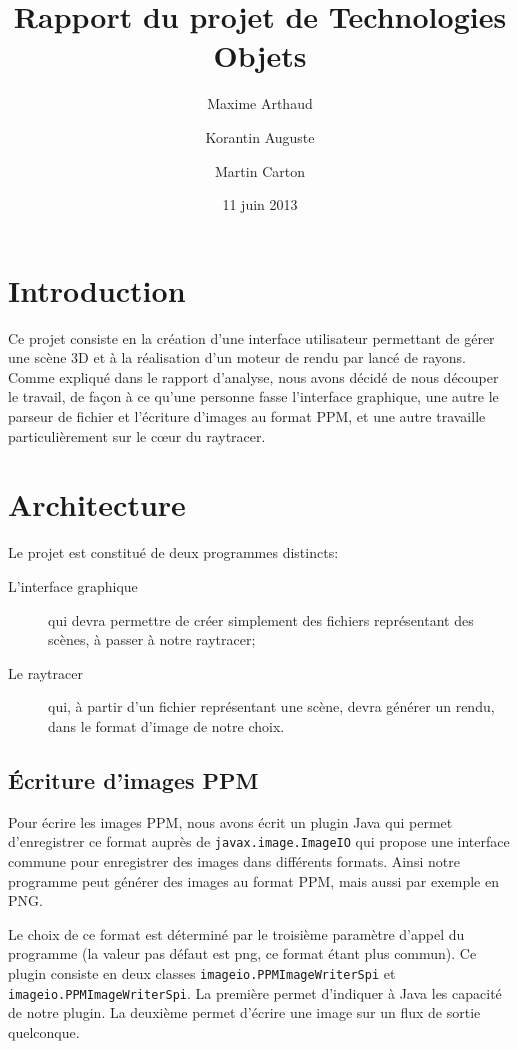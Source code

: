 \documentclass[a4paper]{article}
\title{Rapport du projet de Technologies Objets}
\author{Maxime Arthaud \and Korantin Auguste \and Martin Carton}
\date{11 juin 2013}
\begin{document}
\maketitle 
\tableofcontents
\listoffigures
\newpage

\section{Introduction}
  Ce projet consiste en la création d'une interface utilisateur permettant de
  gérer une scène 3D et à la réalisation d'un moteur de rendu par lancé de
  rayons.
  Comme expliqué dans le rapport d'analyse, nous avons décidé de nous découper
  le travail, de façon à ce qu'une personne fasse l'interface graphique,
  une autre le parseur de fichier et l'écriture d'images au format PPM, et une
  autre travaille particulièrement sur le cœur du raytracer.

\section{Architecture}
  Le projet est constitué de deux programmes distincts:
  \begin{description}
      \item[L'interface graphique] qui devra permettre de créer simplement des
        fichiers représentant des scènes, à passer à notre raytracer;
      \item[Le raytracer] qui, à partir d'un fichier représentant une scène,
        devra générer un rendu, dans le format d'image de notre choix.
  \end{description}

  \subsection{Écriture d'images PPM}
    Pour écrire les images PPM, nous avons écrit un plugin Java qui permet
    d'enregistrer ce format auprès de \verb+javax.image.ImageIO+ qui propose une
    interface commune pour enregistrer des images dans différents formats. Ainsi
    notre programme peut générer des images au format PPM, mais aussi par
    exemple en PNG.
    
    Le choix de ce format est déterminé par le troisième paramètre d'appel du
    programme (la valeur pas défaut est png, ce format étant plus commun).
    Ce plugin consiste en deux classes \verb+imageio.PPMImageWriterSpi+ et
    \verb+imageio.PPMImageWriterSpi+. La première permet d'indiquer à Java les
    capacité de notre plugin. La deuxième permet d'écrire une image sur un flux
    de sortie quelconque.
\end{document}
